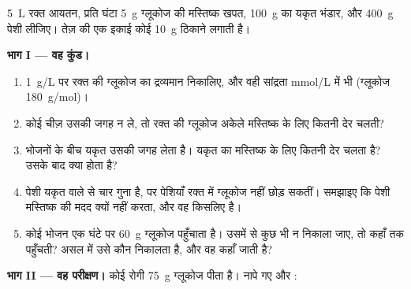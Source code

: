 \begin{problem}
\label{pb:g12:glucose-and-diabetes:1}
\qty{5}{L} रक्त आयतन, प्रति घंटा \qty{5}{g} ग्लूकोज की मस्तिष्क खपत,
\qty{100}{g} का यकृत  भंडार, और \qty{400}{g} पेशी  लीजिए।
तेज़  की एक इकाई कोई \qty{10}{g}  ठिकाने लगाती है।

\medskip
\noindent\textbf{भाग I --- वह कुंड।}
\begin{enumerate}
  \item \qty{1}{g/L} पर रक्त की ग्लूकोज का द्रव्यमान निकालिए, और वही
        सांद्रता \unit{mmol/L} में भी (ग्लूकोज
        \qty{180}{g/mol})।
  \item कोई चीज़ उसकी जगह न ले, तो रक्त की ग्लूकोज अकेले मस्तिष्क के लिए
        कितनी देर चलती?
  \item भोजनों के बीच यकृत उसकी जगह लेता है। यकृत का  मस्तिष्क के
        लिए कितनी देर चलता है? उसके बाद क्या होता है?
  \item पेशी  यकृत वाले से चार गुना है, पर पेशियाँ रक्त में
        ग्लूकोज नहीं छोड़ सकतीं। समझाइए कि पेशी  मस्तिष्क की मदद
        क्यों नहीं करता, और वह किसलिए है।
  \item कोई भोजन एक घंटे पर \qty{60}{g} ग्लूकोज पहुँचाता है। उसमें से कुछ भी
        न निकाला जाए, तो  कहाँ तक पहुँचती? असल में उसे कौन
        निकालता है, और वह कहाँ जाती है?
\end{enumerate}

\medskip
\noindent\textbf{भाग II --- वह परीक्षण।}
कोई रोगी \qty{75}{g} ग्लूकोज पीता है। नापे गए  और
:


\end{problem}
